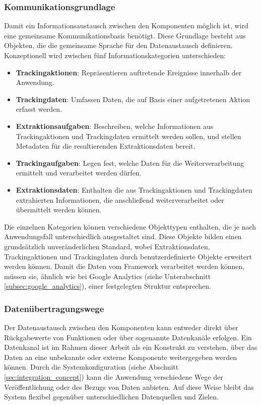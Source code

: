 \subsubsection{Kommunikationsgrundlage}
Damit ein Informationsaustausch zwischen den Komponenten möglich ist, wird eine gemeinsame Kommunikationsbasis benötigt. Diese Grundlage besteht aus Objekten, die die gemeinsame Sprache für den Datenaustausch definieren.  
Konzeptionell wird zwischen fünf Informationskategorien unterschieden:

\begin{itemize}
    \item \textbf{Trackingaktionen}: Repräsentieren auftretende Ereignisse innerhalb der Anwendung.
    \item \textbf{Trackingdaten}: Umfassen Daten, die auf Basis einer aufgetretenen Aktion erfasst werden.
    \item \textbf{Extraktionsaufgaben}: Beschreiben, welche Informationen aus Trackingaktionen und Trackingdaten ermittelt werden sollen, und stellen Metadaten für die resultierenden Extraktionsdaten bereit.
    \item \textbf{Trackingaufgaben}: Legen fest, welche Daten für die Weiterverarbeitung ermittelt und verarbeitet werden dürfen.
    \item \textbf{Extraktionsdaten}: Enthalten die aus Trackingaktionen und Trackingdaten extrahierten Informationen, die anschließend weiterverarbeitet oder übermittelt werden können.
\end{itemize}

Die einzelnen Kategorien können verschiedene Objekttypen enthalten, die je nach Anwendungsfall unterschiedlich ausgestaltet sind. Diese Objekte bilden einen grundsätzlich unveränderlichen Standard, wobei Extraktionsdaten, Trackingaktionen und Trackingdaten durch benutzerdefinierte Objekte erweitert werden können. Damit die Daten vom Framework verarbeitet werden können, müssen sie, ähnlich wie bei Google Analytics (siehe Unterabschnitt \ref{subsec:google_analytics}), einer festgelegten Struktur entsprechen.

\subsubsection{Datenübertragungswege}
Der Datenaustausch zwischen den Komponenten kann entweder direkt über Rückgabewerte von Funktionen oder über sogenannte Datenkanäle erfolgen.  
Ein Datenkanal ist im Rahmen dieser Arbeit als ein Konstrukt zu verstehen, über das Daten an eine unbekannte oder externe Komponente weitergegeben werden können.  
Durch die Systemkonfiguration (siehe Abschnitt \ref{sec:integration_concept}) kann die Anwendung verschiedene Wege der Veröffentlichung oder des Bezugs von Daten anbieten. Auf diese Weise bleibt das System flexibel gegenüber unterschiedlichen Datenquellen und Zielen.


